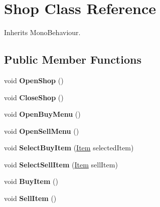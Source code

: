 \hypertarget{class_shop}{}\section{Shop Class Reference}
\label{class_shop}


Inherits Mono\+Behaviour.

\subsection*{Public Member Functions}
\begin{DoxyCompactItemize}
\item 
\mbox{\label{class_shop_aee9936a17da965eef9cbe1d03cd82399}} 
void {\bfseries Open\+Shop} ()
\item 
\mbox{\label{class_shop_a7639e9d56c97c2cc97103f938e239ee5}} 
void {\bfseries Close\+Shop} ()
\item 
\mbox{\label{class_shop_a38abf61cc9a9a1db11483df7f112c6fa}} 
void {\bfseries Open\+Buy\+Menu} ()
\item 
\mbox{\label{class_shop_aa65583a2c72a7bb58b907a8d9243d092}} 
void {\bfseries Open\+Sell\+Menu} ()
\item 
\mbox{\label{class_shop_a5bf06a15011bbffa99284a851d8e3487}} 
void {\bfseries Select\+Buy\+Item} (\mbox{\hyperlink{class_item}{Item}} selected\+Item)
\item 
\mbox{\label{class_shop_ae8d8b6bd8561f7202ed49e0bd5c20de6}} 
void {\bfseries Select\+Sell\+Item} (\mbox{\hyperlink{class_item}{Item}} sell\+Item)
\item 
\mbox{\label{class_shop_a3861c20126e70b54860634005e566e3e}} 
void {\bfseries Buy\+Item} ()
\item 
\mbox{\label{class_shop_a47a6af17c7d69188542885f2aaad24ea}} 
void {\bfseries Sell\+Item} ()
\end{DoxyCompactItemize}
